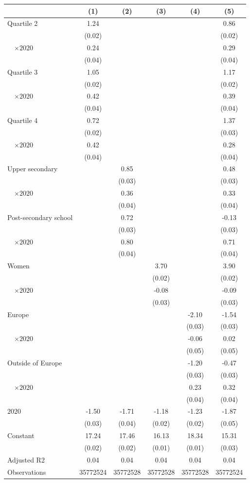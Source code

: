 
\begin{tabular}{@{}l*{5}{S[table-format={-}2.2{\tnote{***}}]}@{}}
\toprule
{} & {(1)} & {(2)} & {(3)} & {(4)} & {(5)}\tabularnewline%
\midrule
Quartile 2 & 1.24\tnote{***} &  &  &  & 0.86\tnote{***}\tabularnewline%
 & (0.02) &  &  &  & \vphantom{1} (0.02)\tabularnewline%
~~\(\times 2020\) & 0.24\tnote{***} &  &  &  & 0.29\tnote{***}\tabularnewline%
 & (0.04) &  &  &  & \vphantom{2} (0.04)\tabularnewline%
Quartile 3 & 1.05\tnote{***} &  &  &  & 1.17\tnote{***}\tabularnewline%
 & (0.02) &  &  &  & (0.02)\tabularnewline%
~~\(\times 2020\) & 0.42\tnote{***} &  &  &  & 0.39\tnote{***}\tabularnewline%
 & (0.04) &  &  &  & \vphantom{1} (0.04)\tabularnewline%
Quartile 4 & 0.72\tnote{***} &  &  &  & 1.37\tnote{***}\tabularnewline%
 & (0.02) &  &  &  & (0.03)\tabularnewline%
~~\(\times 2020\) & 0.42\tnote{***} &  &  &  & 0.28\tnote{***}\tabularnewline%
 & (0.04) &  &  &  & (0.04)\tabularnewline%
Upper secondary &  & 0.85\tnote{***} &  &  & 0.48\tnote{***}\tabularnewline%
 &  & (0.03) &  &  & \vphantom{1} (0.03)\tabularnewline%
~~\(\times 2020\) &  & 0.36\tnote{***} &  &  & 0.33\tnote{***}\tabularnewline%
 &  & (0.04) &  &  & \vphantom{1} (0.04)\tabularnewline%
Post-secondary school &  & 0.72\tnote{***} &  &  & -0.13\tnote{***}\tabularnewline%
 &  & (0.03) &  &  & (0.03)\tabularnewline%
~~\(\times 2020\) &  & 0.80\tnote{***} &  &  & 0.71\tnote{***}\tabularnewline%
 &  & (0.04) &  &  & (0.04)\tabularnewline%
Women &  &  & 3.70\tnote{***} &  & 3.90\tnote{***}\tabularnewline%
 &  &  & (0.02) &  & (0.02)\tabularnewline%
~~\(\times 2020\) &  &  & -0.08\tnote{**} &  & -0.09\tnote{**}\tabularnewline%
 &  &  & (0.03) &  & (0.03)\tabularnewline%
Europe &  &  &  & -2.10\tnote{***} & -1.54\tnote{***}\tabularnewline%
 &  &  &  & (0.03) & \vphantom{1} (0.03)\tabularnewline%
~~\(\times 2020\) &  &  &  & -0.06 & 0.02\tabularnewline%
 &  &  &  & (0.05) & (0.05)\tabularnewline%
Outside of Europe &  &  &  & -1.20\tnote{***} & -0.47\tnote{***}\tabularnewline%
 &  &  &  & (0.03) & (0.03)\tabularnewline%
~~\(\times 2020\) &  &  &  & 0.23\tnote{***} & 0.32\tnote{***}\tabularnewline%
 &  &  &  & (0.04) & (0.04)\tabularnewline%
\midrule
\(2020\) & -1.50\tnote{***} & -1.71\tnote{***} & -1.18\tnote{***} & -1.23\tnote{***} & -1.87\tnote{***}\tabularnewline%
 & (0.03) & (0.04) & (0.02) & (0.02) & (0.05)\tabularnewline%
Constant & 17.24\tnote{***} & 17.46\tnote{***} & 16.13\tnote{***} & 18.34\tnote{***} & 15.31\tnote{***}\tabularnewline%
 & (0.02) & (0.02) & (0.01) & (0.01) & (0.03)\tabularnewline%
\midrule
Adjusted R2 & 0.04 & 0.04 & 0.04 & 0.04 & 0.04\tabularnewline%
Observations & {\num{35772524}} & {\num{35772528}} & {\num{35772528}} & {\num{35772528}} & {\num{35772524}}\tabularnewline%
\bottomrule
\end{tabular}
